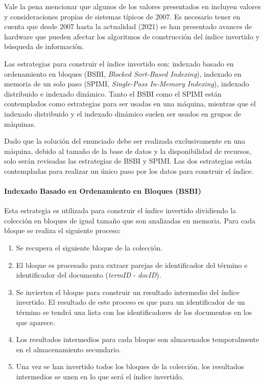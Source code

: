 Vale la pena mencionar que algunos de los valores presentados en \cite{IR-book} incluyen valores y consideraciones propias de sistemas típicos de 2007. Es necesario tener en cuenta que desde 2007 hasta la actualidad (2021) se han presentado avances de hardware que pueden afectar los algoritmos de construcción del índice invertido y búsqueda de información.

Las estrategias para construir el índice invertido son: indexado basado en ordenamiento en bloques (BSBI, \textit{Blocked Sort-Based Indexing}), indexado en memoria de un solo paso (SPIMI, \textit{Single-Pass In-Memory Indexing}), indexado distribuido e indexado dinámico. Tanto el BSBI como el SPIMI están contemplados como estrategias para ser usadas en una máquina, mientras que el indexado distribuido y el indexado dinámico suelen ser usados en grupos de máquinas. 

Dado que la solución del enunciado debe ser realizada exclusivamente en una máquina, debido al tamaño de la base de datos y la disponibilidad de recursos, solo serán revisadas las estrategias de BSBI y SPIMI. Las dos estrategias están contempladas para realizar un único paso por los datos para construir el índice.

\paragraph{Indexado Basado en Ordenamiento en Bloques (BSBI)} Esta estrategia es utilizada para construir el índice invertido dividiendo la colección en bloques de igual tamaño que son analizadas en memoria. Para cada bloque se realiza el siguiente proceso:

\begin{enumerate}
    \item Se recupera el siguiente bloque de la colección.
    \item El bloque es procesado para extraer parejas de identificador del término e identificador del documento (\textit{termID} - \textit{docID}).
    \item Se invierten el bloque para construir un resultado intermedio del índice invertido. El resultado de este proceso es que para un identificador de un término se tendrá una lista con los identificadores de los documentos en los que aparece.
    \item Los resultados intermedios para cada bloque son almacenados temporalmente en el almacenamiento secundario.
    \item Una vez se han invertido todos los bloques de la colección, los resultados intermedios se unen en lo que será el índice invertido.
\end{enumerate}

